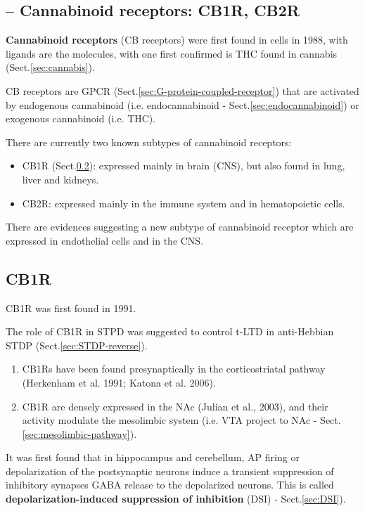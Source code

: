 \subsection{ -- Cannabinoid receptors: CB1R, CB2R}
\label{sec:cannabinoid-receptors}
\label{sec:endocannabinoid-receptors}

{\bf Cannabinoid receptors} (CB receptors) were first found in cells in 1988,
with ligands are the molecules, with one first confirmed is THC found in
cannabis (Sect.\ref{sec:cannabis}).

CB receptors are GPCR (Sect.\ref{sec:G-protein-coupled-receptor}) that are
activated by endogenous cannabinoid (i.e.
endocannabinoid - Sect.\ref{sec:endocannabinoid}) or exogenous cannabinoid
(i.e. THC).

There are currently two known subtypes of cannabinoid receptors:
\begin{itemize}
  \item CB1R (Sect.\ref{sec:CB1R}): expressed mainly in brain (CNS), but also
  found in lung, liver and kidneys.
  
  \item CB2R: expressed mainly in the immune system and in hematopoietic cells.
\end{itemize}
There are evidences suggesting a new subtype of cannabinoid receptor
which are expressed in endothelial cells and in the CNS.

\subsection{CB1R}
\label{sec:CB1R}

CB1R was first found in 1991.


The role of CB1R in STPD was suggested to control t-LTD in anti-Hebbian STDP
(Sect.\ref{sec:STDP-reverse}).
\begin{enumerate}
  
  \item  CB1Rs have been found presynaptically in the corticostriatal pathway
  (Herkenham et al. 1991; Katona et al. 2006).


  \item CB1R are densely expressed in the NAc (Julian et al., 2003), and their
  activity modulate the mesolimbic system (i.e. VTA project to NAc -
  Sect.\ref{sec:mesolimbic-pathway}).

\end{enumerate}

It was first found that in hippocampus and cerebellum, AP firing or
depolarization of the postsynaptic neurons induce a transient suppression of
inhibitory synapses GABA release to the depolarized neurons.
This is called {\bf depolarization-induced suppression of inhibition} (DSI) -
Sect.\ref{sec:DSI}).

